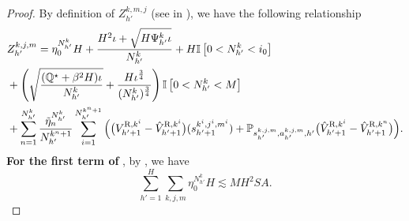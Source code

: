 \documentclass{article}
\newcommand{\R}{\textnormal{R}}
\begin{document}
\begin{proof}
By definition of $Z_{h'}^{k,m,j}$ (see  in ), we have the following relationship
\begin{align}
\label{upperzbegin}
     &Z_{h'}^{k,j,m}= \eta_0^{N_{h'}^k}H +\frac{H^2\iota+\sqrt{H\Psi_{h'}^k\iota}}{N_{h'}^k}+ H\mathbb{I}\left[0<N_{h'}^k<i_0 \right] \nonumber\\
    &+\left(\sqrt{\frac{(\mathbb{Q^{\star}}+\beta^2H)\iota}{N_{h'}^k}}+\frac{H\iota^{\frac{3}{4}}}{(N_{h'}^k)^{\frac{3}{4}}}\right)\mathbb{I}\left[ 0<N_{h'}^k< M\right] \nonumber\\
    &+\sum_{n=1}^{N_{h'}^k} \frac{\Tilde{\eta}_n^{N_{h'}^k}}{N_{h'}^{k^n+1}} \sum_{i=1}^{N_{h'}^{k^n+1}}\Big(\big(V_{h'+1}^{\R,k^i}-\hat{V}_{h'+1}^{\R,k^i}\big)(s_{h'+1}^{k^i,j^i,m^i})+\mathbb{P}_{s_{h'}^{k,j,m}, a_{h'}^{k,j,m},h'}\big(\hat{V}_{h'+1}^{\R,k^i}-\hat{V}_{h'+1}^{\R,k^n}\big)\Big).
\end{align}
\textbf{For the first term of }, by , we have
\begin{equation}
    \label{z1}
    \sum_{h' = 1}^{H}\sum_{k,j,m}\eta_0^{N_{h'}^k}H  \lesssim MH^2SA.
\end{equation}


\end{proof}
\end{document}
